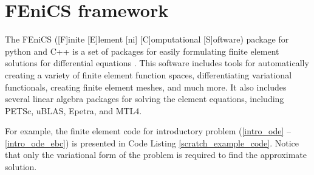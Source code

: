 \section{FEniCS framework}

The FEniCS ([F]inite [E]lement [ni] [C]omputational [S]oftware)  package for python and C++ is a set of packages for easily formulating finite element solutions for differential equations \citep{logg_2012}.  This software includes tools for automatically creating a variety of finite element function spaces, differentiating variational functionals, creating finite element meshes, and much more.  It also includes several linear algebra packages for solving the element equations, including PETSc, uBLAS, Epetra, and MTL4.

For example, the finite element code for introductory problem (\ref{intro_ode} -- \ref{intro_ode_ebc}) is presented in Code Listing \ref{scratch_example_code}.  Notice that only the variational form of the problem is required to find the approximate solution.


